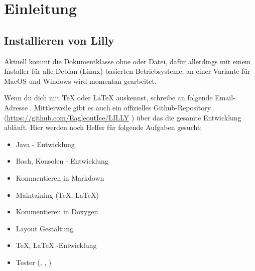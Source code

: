 \chapter{Einleitung}
\section{Installieren von Lilly}
Aktuell kommt die Dokumentklasse ohne  oder  Datei, dafür allerdings mit einem Installer für alle Debian (Linux) basierten Betriebsysteme, an einer Variante für MacOS und Windows wird momentan gearbeitet.

\begin{bemerkung}[Mithilfe]
    Wenn du dich mit \TeX{} oder \LaTeX{} auskennst, schreibe an folgende Email-Adresse \T{\AUTHORMAIL}.\smallskip\newline
    Mittlerweile gibt es auch ein offizielles Github-Repository (\url{https://github.com/EagleoutIce/LILLY} \href{https://github.com/EagleoutIce/LILLY}{\faGithub})
    über das die gesamte Entwicklung abläuft. Hier werden noch Helfer für folgende Aufgaben gesucht:
    \begin{multicols}{2}
        \begin{itemize}[label=$\diamond$]
            \item Java - Entwicklung
            \item Bash, Konsolen - Entwicklung
            \item Kommentieren in Markdown
            \item Maintaining (\TeX, \LaTeX)
            \item Kommentieren in Doxygen
            \item Layout Gestaltung
            \item \TeX, \LaTeX{} -Entwicklung
            \item Tester (\faLinux, \faApple, \faWindows)
        \end{itemize}
    \end{multicols}
\end{bemerkung}

